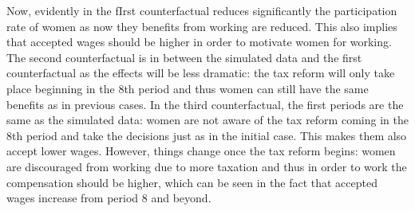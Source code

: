 \documentclass[11pt]{article}
\begin{document}
Now, evidently in the fIrst counterfactual reduces significantly the participation rate of women as now they benefits from working are reduced. This also implies that accepted wages should be higher in order to motivate women for working. The second counterfactual is in between the simulated data and the first counterfactual as the effects will be less dramatic: the tax reform will only take place beginning in the 8th period and thus women can still have the same benefits as in previous cases. In the third counterfactual, the first periods are the same as the simulated data: women are not aware of the tax reform coming in the 8th period and take the decisions just as in the initial case. This makes them also accept lower wages. However, things change once the tax reform begins: women are discouraged from working due to more taxation and thus in order to work the compensation should be higher, which can be seen in the fact that accepted wages increase from period 8 and beyond.



\nocite{prescott04}


\end{document}

